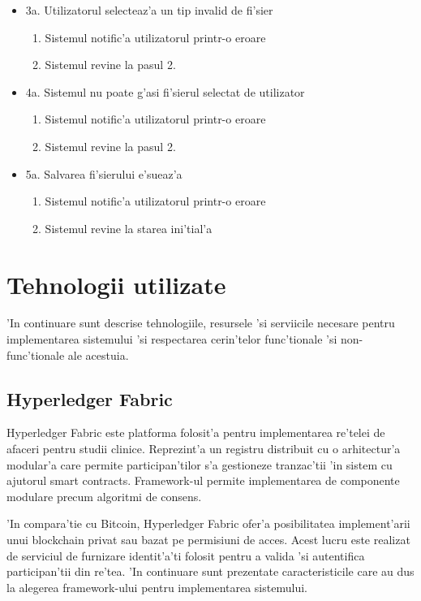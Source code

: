 \documentclass[12pt,a4paper,twoside]{report}
\begin{document}
\begin{itemize}
    \item 3a. Utilizatorul selecteaz'a un tip invalid de fi'sier
        \begin{enumerate}
            \item Sistemul notific'a utilizatorul printr-o eroare
            \item Sistemul revine la pasul 2.
        \end{enumerate}
    \item 4a. Sistemul nu poate g'asi fi'sierul selectat de utilizator
        \begin{enumerate}
            \item Sistemul notific'a utilizatorul printr-o eroare
            \item Sistemul revine la pasul 2.
        \end{enumerate}
    \item 5a. Salvarea fi'sierului e'sueaz'a
        \begin{enumerate}
            \item Sistemul notific'a utilizatorul printr-o eroare
            \item Sistemul revine la starea ini'tial'a
        \end{enumerate}
    
\end{itemize}
\section{Tehnologii utilizate}
'In continuare sunt descrise tehnologiile, resursele 'si serviicile necesare pentru implementarea sistemului 'si respectarea cerin'telor func'tionale 'si non-func'tionale ale acestuia.
\subsection{Hyperledger Fabric}\label{section:fab}
Hyperledger Fabric este platforma folosit'a pentru implementarea re'telei de afaceri pentru studii clinice. Reprezint'a un registru distribuit cu o arhitectur'a modular'a care permite participan'tilor s'a gestioneze tranzac'tii 'in sistem cu ajutorul smart contracts. Framework-ul permite implementarea de componente modulare precum algoritmi de consens. 

'In compara'tie cu Bitcoin, Hyperledger Fabric ofer'a posibilitatea implement'arii unui blockchain privat sau bazat pe permisiuni de acces. Acest lucru este realizat de serviciul de furnizare identit'a'ti folosit pentru a valida 'si autentifica participan'tii din re'tea. 'In continuare sunt prezentate caracteristicile care au dus la alegerea framework-ului pentru implementarea sistemului.
\end{document}
